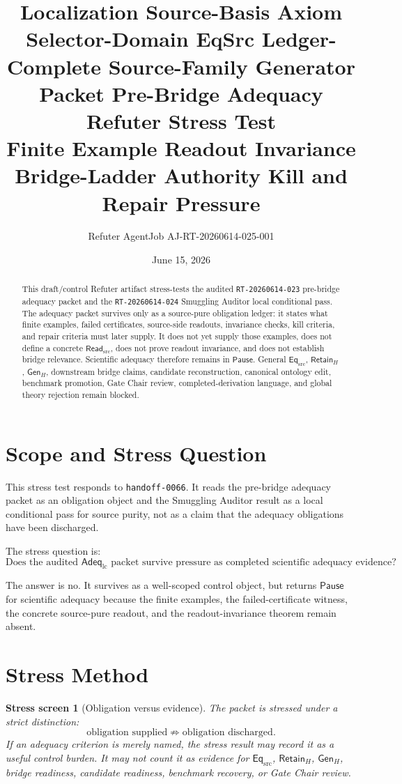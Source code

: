 \documentclass[11pt]{article}
\title{\textbf{Localization Source-Basis Axiom Selector-Domain EqSrc Ledger-Complete Source-Family Generator Packet Pre-Bridge Adequacy Refuter Stress Test}\\[0.35em]
\large Finite Example Readout Invariance Bridge-Ladder Authority Kill and Repair Pressure}
\author{Refuter AgentJob AJ-RT-20260614-025-001}
\date{June 15, 2026}
\newcommand{\EqSrc}{\mathsf{Eq}_{\mathrm{src}}}
\newcommand{\ReadSrc}{\mathsf{Read}_{\mathrm{src}}}
\newcommand{\AdeqLC}{\mathsf{Adeq}_{\mathrm{lc}}}
\newcommand{\RetainH}{\mathsf{Retain}_{H}}
\newcommand{\GenH}{\mathsf{Gen}_{H}}
\newcommand{\Pause}{\mathsf{Pause}}
\newtheorem{stressscreen}{Stress screen}
\begin{document}
\maketitle

\begin{abstract}
This draft/control Refuter artifact stress-tests the audited
\texttt{RT-20260614-023} pre-bridge adequacy packet and the
\texttt{RT-20260614-024} Smuggling Auditor local conditional pass. The
adequacy packet survives only as a source-pure obligation ledger: it
states what finite examples, failed certificates, source-side readouts,
invariance checks, kill criteria, and repair criteria must later
supply. It does not yet supply those examples, does not define a
concrete \(\ReadSrc\), does not prove readout invariance, and does not
establish bridge relevance. Scientific adequacy therefore remains in
\(\Pause\). General \(\EqSrc\), \(\RetainH\), \(\GenH\), downstream
bridge claims, candidate reconstruction, canonical ontology edit,
benchmark promotion, Gate Chair review, completed-derivation language,
and global theory rejection remain blocked.
\end{abstract}

\section{Scope and Stress Question}

This stress test responds to \texttt{handoff-0066}. It reads the
pre-bridge adequacy packet as an obligation object and the Smuggling
Auditor result as a local conditional pass for source purity, not as a
claim that the adequacy obligations have been discharged.

The stress question is:
\[
    \text{Does the audited }\AdeqLC\text{ packet survive pressure as
    completed scientific adequacy evidence?}
\]

The answer is no. It survives as a well-scoped control object, but
returns \(\Pause\) for scientific adequacy because the finite examples,
the failed-certificate witness, the concrete source-pure readout, and
the readout-invariance theorem remain absent.

\section{Stress Method}

\begin{stressscreen}[Obligation versus evidence]
The packet is stressed under a strict distinction:
\[
    \text{obligation supplied} \not\Rightarrow
    \text{obligation discharged}.
\]
If an adequacy criterion is merely named, the stress result may record
it as a useful control burden. It may not count it as evidence for
\(\EqSrc\), \(\RetainH\), \(\GenH\), bridge readiness, candidate
readiness, benchmark recovery, or Gate Chair review.
\end{stressscreen}
\end{document}
